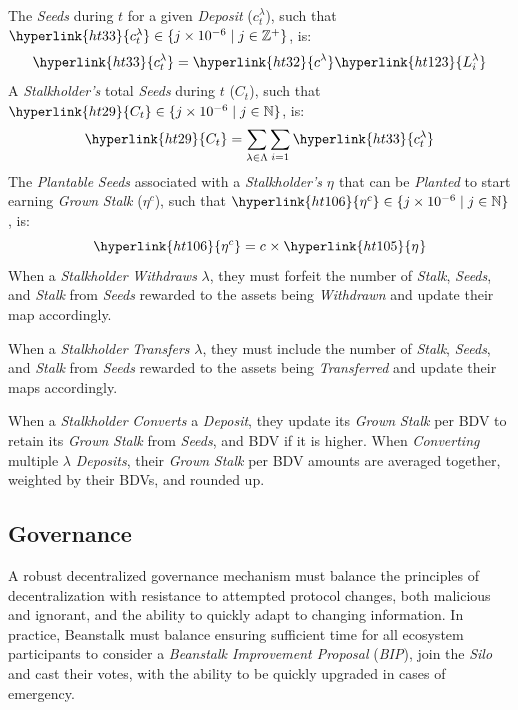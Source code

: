 \documentclass[tikz]{article}
\newcommand{\term}[1]{\textsl{#1}}
\newcommand{\bean}{} %
\begin{document}
The \term{Seeds} during \hyperlink{ht204}{$t$} for a given \term{Deposit} (\hyperlink{ht33}{$c_{t}^{\lambda}$}), such that $\hyperlink{ht33}{c_{t}^{\lambda}} \in \{j \times 10^{-6} \mid j \in \mathbb{Z}^{+} \}$, is:
$$\hyperlink{ht33}{c_{t}^{\lambda}} = \hyperlink{ht32}{c^{\lambda}} \hyperlink{ht123}{L_i^{\lambda}}$$
A \term{Stalkholder's} total \term{Seeds} during \hyperlink{ht204}{$t$} (\hyperlink{ht29}{$C_t$}), such that $\hyperlink{ht29}{C_t} \in \{j \times 10^{-6} \mid j \in \mathbb{N} \}$, is:
$$\hyperlink{ht29}{C_t} = \sum_{\lambda \in \Lambda} \sum_{i=1} \hyperlink{ht33}{c_{t}^{\lambda}}$$
The \term{Plantable} \term{Seeds} associated with a \term{Stalkholder's} \hyperlink{ht105}{$\eta^{\bean}$} that can be \term{Planted} to start earning \term{Grown} \term{Stalk} (\hyperlink{ht106}{$\eta^{c}$}), such that $\hyperlink{ht106}{\eta^{c}} \in \{j \times 10^{-6} \mid j \in \mathbb{N} \}$, is:
$$\hyperlink{ht106}{\eta^{c}} = c^{\bean} \times \hyperlink{ht105}{\eta^{\bean}}$$
When a \term{Stalkholder} \term{Withdraws} \hyperlink{ht126}{$\lambda$}, they must forfeit the number of \term{Stalk}, \term{Seeds}, and \term{Stalk} from \term{Seeds} rewarded to the assets being \term{Withdrawn} and update their map accordingly.

When a \term{Stalkholder} \term{Transfers} \hyperlink{ht126}{$\lambda$}, they must include the number of \term{Stalk}, \term{Seeds}, and \term{Stalk} from \term{Seeds} rewarded to the assets being \term{Transferred} and update their maps accordingly.

When a \term{Stalkholder} \term{Converts} a \term{Deposit}, they update its \term{Grown} \term{Stalk} per BDV to retain its \term{Grown} \term{Stalk} from \term{Seeds}, and BDV if it is higher. When \term{Converting} multiple \hyperlink{ht126}{$\lambda$} \term{Deposits}, their \term{Grown} \term{Stalk} per BDV amounts are averaged together, weighted by their BDVs, and rounded up.

\subsection{Governance}
\vspace*{-1mm}
A robust decentralized governance mechanism must balance the principles of decentralization with resistance to attempted protocol changes, both malicious and ignorant, and the ability to quickly adapt to changing information. In practice, Beanstalk must balance ensuring sufficient time for all ecosystem participants to consider a \term{Beanstalk Improvement Proposal} (\term{BIP}), join the \term{Silo} and cast their votes, with the ability to be quickly upgraded in cases of emergency. 
\end{document}
